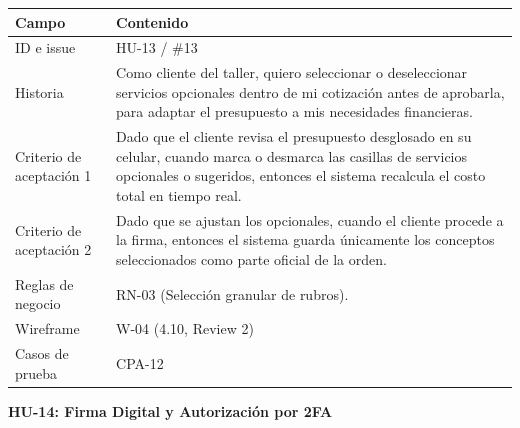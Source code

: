 {\def\LTcaptype{none} %
\begin{longtable}[]{@{}
  >{\raggedright\arraybackslash}p{}
  >{\raggedright\arraybackslash}p{}@{}}
\toprule\noalign{}
\begin{minipage}[b]{\linewidth}\raggedright
\textbf{Campo}
\end{minipage} & \begin{minipage}[b]{\linewidth}\raggedright
\textbf{Contenido}
\end{minipage} \\
\midrule\noalign{}
\endhead
\bottomrule\noalign{}
\endlastfoot
ID e issue & HU-13 / \#13 \\
Historia & Como cliente del taller, quiero seleccionar o deseleccionar
servicios opcionales dentro de mi cotización antes de aprobarla, para
adaptar el presupuesto a mis necesidades financieras. \\
Criterio de aceptación 1 & Dado que el cliente revisa el presupuesto
desglosado en su celular, cuando marca o desmarca las casillas de
servicios opcionales o sugeridos, entonces el sistema recalcula el costo
total en tiempo real. \\
Criterio de aceptación 2 & Dado que se ajustan los opcionales, cuando el
cliente procede a la firma, entonces el sistema guarda únicamente los
conceptos seleccionados como parte oficial de la orden. \\
Reglas de negocio & RN-03 (Selección granular de rubros). \\
Wireframe & W-04 (4.10, Review 2) \\
Casos de prueba & CPA-12 \\
\end{longtable}
}

\textbf{HU-14: Firma Digital y Autorización por 2FA}

